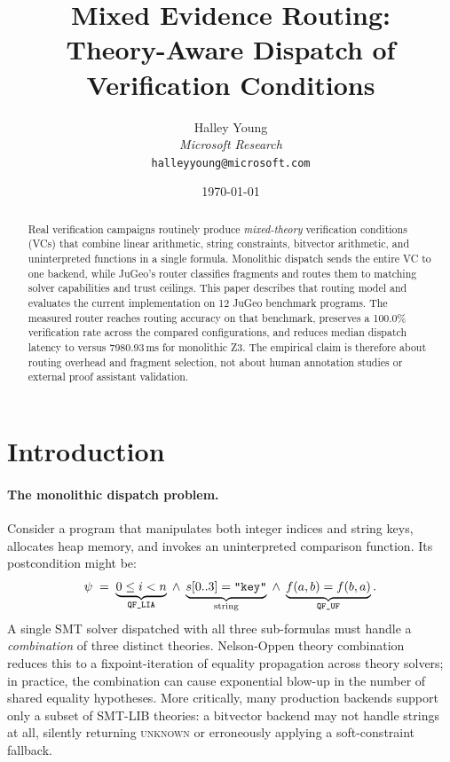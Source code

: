 \documentclass[11pt]{article}
\title{\textbf{Mixed Evidence Routing:\\Theory-Aware Dispatch of Verification
Conditions}}
\author{%
  Halley Young\\
  \textit{Microsoft Research}\\
  \texttt{halleyyoung@microsoft.com}
}
\date{\today}
\newcommand{\VC}{\psi}                    %
\providecommand{\routeacc}{\ppTwentythreeJugeoRouteAcc}
\providecommand{\medroute}{\ppTwentythreeJugeoLatency}
\begin{document}
\maketitle

\begin{abstract}
Real verification campaigns routinely produce \emph{mixed-theory}
verification conditions (\textsc{VC}s) that combine linear arithmetic,
string constraints, bitvector arithmetic, and uninterpreted functions
in a single formula.  Monolithic dispatch sends the entire \textsc{VC}
to one backend, while JuGeo's router classifies fragments and routes
them to matching solver capabilities and trust ceilings.  This paper
describes that routing model and evaluates the current implementation on
12 JuGeo benchmark programs.  The measured router reaches
\routeacc{} routing accuracy on that benchmark, preserves a 100.0\%
verification rate across the compared configurations, and reduces median
dispatch latency to \medroute{} versus 7980.93\,ms for monolithic Z3.
The empirical claim is therefore about routing overhead and fragment
selection, not about human annotation studies or external proof
assistant validation.
\end{abstract}

\newpage

\section{Introduction}\label{sec:intro}

\paragraph{The monolithic dispatch problem.}
Consider a program that manipulates both integer indices and string
keys, allocates heap memory, and invokes an uninterpreted comparison
function.  Its postcondition might be:
\[
  \VC \;=\; \underbrace{0 \leq i < n}_{\QFLIA}
  \;\wedge\;
  \underbrace{s[0..3] = \texttt{"key"}}_{\mathrm{string}}
  \;\wedge\;
  \underbrace{f(a,b) = f(b,a)}_{\QFUF}.
\]
A single SMT solver dispatched with all three sub-formulas must handle
a \emph{combination} of three distinct theories.  Nelson-Oppen theory
combination~\cite{Nelson1979} reduces this to a fixpoint-iteration of
equality propagation across theory solvers; in practice, the
combination can cause exponential blow-up in the number of shared
equality hypotheses.  More critically, many production backends support
only a subset of SMT-LIB theories: a bitvector backend may not handle
strings at all, silently returning \textsc{unknown} or erroneously
applying a soft-constraint fallback.
\end{document}
